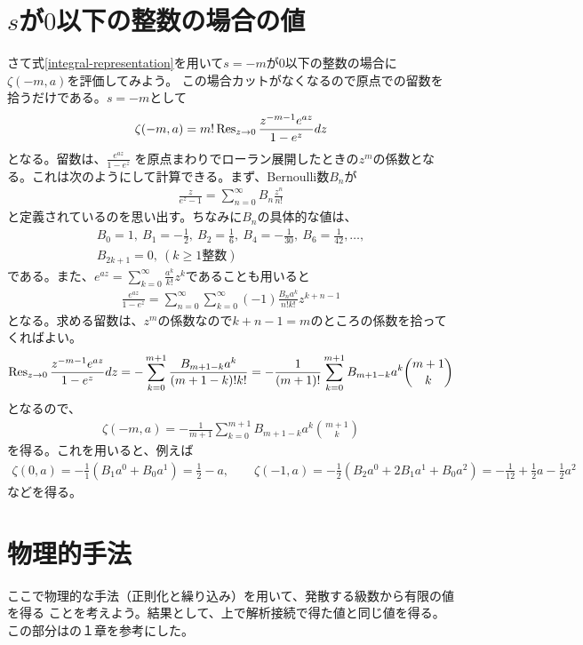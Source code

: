 \documentclass[pandoc,nomag,12pt,a4paper]{bxjsarticle}
\begin{document}
\section{$s$が$0$以下の整数の場合の値}
さて式\eqref{integral-representation}を用いて$s=-m$が$0$以下の整数の場合に$\zeta(-m,a)$を評価してみよう。
この場合カットがなくなるので原点での留数を拾うだけである。$s=-m$として
\begin{align}
  \zeta(-m,a)=m!\Res_{z\to 0}\frac{z^{-m-1}e^{az}}{1-e^{z}}dz
  \label{residue}
\end{align}
となる。留数は、$\frac{e^{az}}{1-e^{z}}$ を原点まわりでローラン展開したときの$z^m$の係数となる。これは次のようにして計算できる。まず、Bernoulli数$B_n$が
\begin{align}
  \frac{z}{e^z-1}=\sum_{n=0}^{\infty}B_{n}\frac{z^n}{n!}
\end{align}
と定義されているのを思い出す。ちなみに$B_n$の具体的な値は、
\begin{align}
  B_0=1,\ B_1=-\frac{1}{2},\ B_2=\frac{1}{6},\ B_4=-\frac{1}{30},\ B_6=\frac{1}{42},\dots,\\
  B_{2k+1}=0,\ (k\ge 1 \text{整数})
\end{align}
である。また、$e^{az}=\sum_{k=0}^{\infty}\frac{a^k}{k!}z^k$であることも用いると
\begin{align}
  \frac{e^{az}}{1-e^{z}}=\sum_{n=0}^{\infty}\sum_{k=0}^{\infty}(-1)\frac{B_n a^k}{n!k!}z^{k+n-1}
\end{align}
となる。求める留数は、$z^{m}$の係数なので$k+n-1=m$のところの係数を拾ってくればよい。
\begin{align}
  \Res_{z\to 0}\frac{z^{-m-1}e^{az}}{1-e^{z}}dz
  =-\sum_{k=0}^{m+1}\frac{B_{m+1-k} a^k}{(m+1-k)!k!}
  =-\frac{1}{(m+1)!}\sum_{k=0}^{m+1}B_{m+1-k} a^k\binom{m+1}{k}
\end{align}
となるので、
\begin{align}
  \zeta(-m,a)=-\frac{1}{m+1}\sum_{k=0}^{m+1}B_{m+1-k} a^k\binom{m+1}{k}
\end{align}
を得る。これを用いると、例えば
\begin{align}
  \zeta(0,a)=-\frac11(B_1a^0+B_0a^1)=\frac12-a,\qquad
  \zeta(-1,a)=-\frac12(B_2a^0+2B_1a^1+B_0a^2)=-\frac{1}{12}+\frac12 a-\frac12a^2
\end{align}
などを得る。
\section{物理的手法}

ここで物理的な手法（正則化と繰り込み）を用いて、発散する級数から有限の値を得る
ことを考えよう。結果として、上で解析接続で得た値と同じ値を得る。
この部分は\cite{Polchinski:1998rq}の１章を参考にした。
\end{document}
